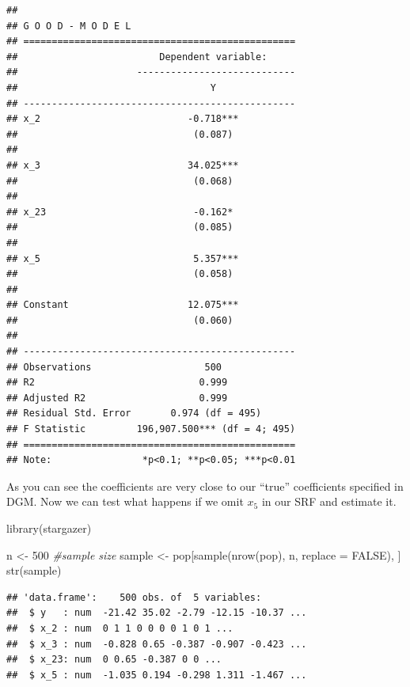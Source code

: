 \documentclass[
]{book}
\newenvironment{Shaded}{\begin{snugshade}}{\end{snugshade}}
\newcommand{\AttributeTok}[1]{\textcolor[rgb]{0.77,0.63,0.00}{#1}}
\newcommand{\CommentTok}[1]{\textcolor[rgb]{0.56,0.35,0.01}{\textit{#1}}}
\newcommand{\ConstantTok}[1]{\textcolor[rgb]{0.00,0.00,0.00}{#1}}
\newcommand{\DecValTok}[1]{\textcolor[rgb]{0.00,0.00,0.81}{#1}}
\newcommand{\FunctionTok}[1]{\textcolor[rgb]{0.00,0.00,0.00}{#1}}
\newcommand{\NormalTok}[1]{#1}
\newcommand{\OtherTok}[1]{\textcolor[rgb]{0.56,0.35,0.01}{#1}}
\theoremstyle{definition}
\theoremstyle{definition}
\theoremstyle{definition}
\theoremstyle{definition}
\theoremstyle{remark}
\begin{document}
\begin{verbatim}
## 
## G O O D - M O D E L
## ================================================
##                         Dependent variable:     
##                     ----------------------------
##                                  Y              
## ------------------------------------------------
## x_2                          -0.718***          
##                               (0.087)           
##                                                 
## x_3                          34.025***          
##                               (0.068)           
##                                                 
## x_23                          -0.162*           
##                               (0.085)           
##                                                 
## x_5                           5.357***          
##                               (0.058)           
##                                                 
## Constant                     12.075***          
##                               (0.060)           
##                                                 
## ------------------------------------------------
## Observations                    500             
## R2                             0.999            
## Adjusted R2                    0.999            
## Residual Std. Error       0.974 (df = 495)      
## F Statistic         196,907.500*** (df = 4; 495)
## ================================================
## Note:                *p<0.1; **p<0.05; ***p<0.01
\end{verbatim}

As you can see the coefficients are very close to our ``true'' coefficients specified in DGM. Now we can test what happens if we omit \(x_5\) in our SRF and estimate it.

\begin{Shaded}
\begin{Highlighting}[]
\FunctionTok{library}\NormalTok{(stargazer)}

\NormalTok{n }\OtherTok{\textless{}{-}} \DecValTok{500} \CommentTok{\#sample size}
\NormalTok{sample }\OtherTok{\textless{}{-}}\NormalTok{ pop[}\FunctionTok{sample}\NormalTok{(}\FunctionTok{nrow}\NormalTok{(pop), n, }\AttributeTok{replace =} \ConstantTok{FALSE}\NormalTok{), ]}
\FunctionTok{str}\NormalTok{(sample)}
\end{Highlighting}
\end{Shaded}

\begin{verbatim}
## 'data.frame':    500 obs. of  5 variables:
##  $ y   : num  -21.42 35.02 -2.79 -12.15 -10.37 ...
##  $ x_2 : num  0 1 1 0 0 0 0 1 0 1 ...
##  $ x_3 : num  -0.828 0.65 -0.387 -0.907 -0.423 ...
##  $ x_23: num  0 0.65 -0.387 0 0 ...
##  $ x_5 : num  -1.035 0.194 -0.298 1.311 -1.467 ...
\end{verbatim}
\end{document}
